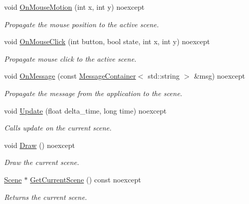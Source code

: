 \begin{DoxyCompactItemize}
void \hyperlink{class_blade_1_1_scene_manager_a38dfdd6584e00fbf5b5181cc772b8050}{On\+Mouse\+Motion} (int x, int y) noexcept
\begin{DoxyCompactList}\small\item\em Propagate the mouse position to the active scene. \end{DoxyCompactList}\item 
void \hyperlink{class_blade_1_1_scene_manager_a2dc0c80a65f765e2ef4ac4ca69b9231e}{On\+Mouse\+Click} (int button, bool state, int x, int y) noexcept
\begin{DoxyCompactList}\small\item\em Propagate mouse click to the active scene. \end{DoxyCompactList}\item 
void \hyperlink{class_blade_1_1_scene_manager_ae0bc94af4c9686236c90d2a9a6529062}{On\+Message} (const \hyperlink{class_blade_1_1_ref_counted_container}{Message\+Container}$<$ std\+::string $>$ \&msg) noexcept
\begin{DoxyCompactList}\small\item\em Propagate the message from the application to the scene. \end{DoxyCompactList}\item 
void \hyperlink{class_blade_1_1_scene_manager_a68f1c083b875be3634870758ee697792}{Update} (float delta\+\_\+time, long time) noexcept
\begin{DoxyCompactList}\small\item\em Calls update on the current scene. \end{DoxyCompactList}\item 
\mbox{\label{class_blade_1_1_scene_manager_a6e393993821909643377f638766a3cf9}} 
void \hyperlink{class_blade_1_1_scene_manager_a6e393993821909643377f638766a3cf9}{Draw} () noexcept
\begin{DoxyCompactList}\small\item\em Draw the current scene. \end{DoxyCompactList}\item 
\mbox{\label{class_blade_1_1_scene_manager_a52232b73f5749916a22b6cf01707140e}} 
\hyperlink{class_blade_1_1_scene}{Scene} $\ast$ \hyperlink{class_blade_1_1_scene_manager_a52232b73f5749916a22b6cf01707140e}{Get\+Current\+Scene} () const noexcept
\begin{DoxyCompactList}\small\item\em Returns the current scene. \end{DoxyCompactList}\end{DoxyCompactItemize}


